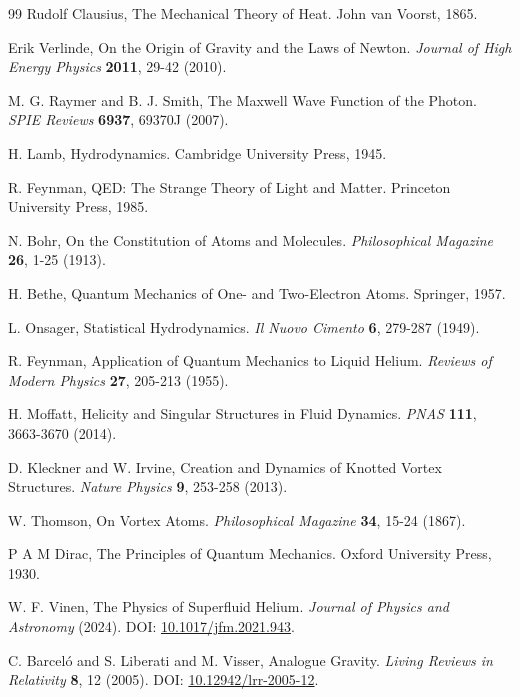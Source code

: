 \documentclass[a4paper,10pt]{article}
\begin{document}
\begin{thebibliography}{99}
Rudolf Clausius,
\newblock The Mechanical Theory of Heat.
\newblock John van Voorst, 1865.


Erik Verlinde,
\newblock On the Origin of Gravity and the Laws of Newton.
\textit{Journal of High Energy Physics} \textbf{2011}, 29-42 (2010).


M. G. Raymer and B. J. Smith,
\newblock The Maxwell Wave Function of the Photon.
\textit{SPIE Reviews} \textbf{6937}, 69370J (2007).


H. Lamb,
\newblock Hydrodynamics.
\newblock Cambridge University Press, 1945.


R. Feynman,
\newblock QED: The Strange Theory of Light and Matter.
\newblock Princeton University Press, 1985.


N. Bohr,
\newblock On the Constitution of Atoms and Molecules.
\textit{Philosophical Magazine} \textbf{26}, 1-25 (1913).


H. Bethe,
\newblock Quantum Mechanics of One- and Two-Electron Atoms.
\newblock Springer, 1957.


L. Onsager,
\newblock Statistical Hydrodynamics.
\textit{Il Nuovo Cimento} \textbf{6}, 279-287 (1949).


R. Feynman,
\newblock Application of Quantum Mechanics to Liquid Helium.
\textit{Reviews of Modern Physics} \textbf{27}, 205-213 (1955).


H. Moffatt,
\newblock Helicity and Singular Structures in Fluid Dynamics.
\textit{PNAS} \textbf{111}, 3663-3670 (2014).


D. Kleckner and W. Irvine,
\newblock Creation and Dynamics of Knotted Vortex Structures.
\textit{Nature Physics} \textbf{9}, 253-258 (2013).


W. Thomson,
\newblock On Vortex Atoms.
\textit{Philosophical Magazine} \textbf{34}, 15-24 (1867).


P A M Dirac,
\newblock The Principles of Quantum Mechanics.
\newblock Oxford University Press, 1930.


W. F. Vinen,
\newblock The Physics of Superfluid Helium.
\textit{Journal of Physics and Astronomy} (2024).
\newblock DOI: \href{https://doi.org/10.1017/jfm.2021.943}{10.1017/jfm.2021.943}.


C. Barceló and S. Liberati and M. Visser,
\newblock Analogue Gravity.
\textit{Living Reviews in Relativity} \textbf{8}, 12 (2005).
\newblock DOI: \href{https://doi.org/10.12942/lrr-2005-12}{10.12942/lrr-2005-12}.



\end{thebibliography}
\end{document}
